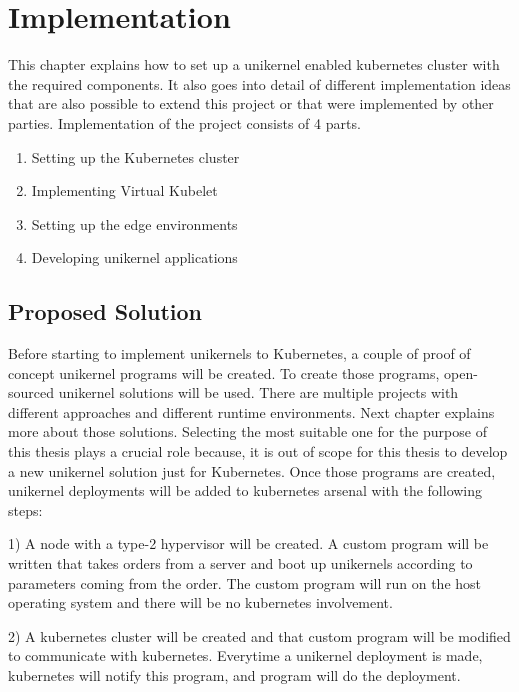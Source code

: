 \chapter{Implementation}\label{chapter:implementation}
This chapter explains how to set up a unikernel enabled kubernetes cluster with the required components. It also goes into detail of different implementation ideas that are also possible to extend this project or that were implemented by other parties. Implementation of the project consists of 4 parts.
\begin{enumerate}
\item Setting up the Kubernetes cluster
\item Implementing Virtual Kubelet
\item Setting up the edge environments
\item Developing unikernel applications
\end{enumerate}








\iffalse
\section{Proposed Solution}

Before starting to implement unikernels to Kubernetes, a couple of proof of concept unikernel programs will be created. To create those programs, open-sourced unikernel solutions will be used. There are multiple projects with different approaches and different runtime environments. Next chapter explains more about those solutions. Selecting the most suitable one for the purpose of this thesis plays a crucial role because, it is out of scope for this thesis to develop a new unikernel solution just for Kubernetes. Once those programs are created, unikernel deployments will be added to kubernetes arsenal with the following steps:

1) A node with a type-2 hypervisor will be created. A custom program will be written that takes orders from a server and boot up unikernels according to parameters coming from the order. The custom program will run on the host operating system and there will be no kubernetes involvement.

2) A kubernetes cluster will be created and that custom program will be modified to communicate with kubernetes. Everytime a unikernel deployment is made, kubernetes will notify this program, and program will do the deployment.

